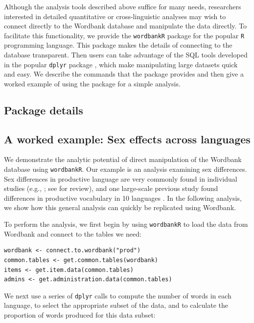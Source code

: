 \documentclass[doc,noapacite]{apa2}
\begin{document}
Although the analysis tools described above suffice for many needs, researchers interested in detailed quantitative or cross-linguistic analyses may wish to connect directly to the Wordbank database and manipulate the data directly. To facilitate this functionality, we provide the \texttt{wordbankR} package for the popular \texttt{R} programming language. This package makes the details of connecting to the database transparent. Then users can take advantage of the SQL tools developed in the popular \texttt{dplyr} package \cite{wickham2014}, which make manipulating large datasets quick and easy. We describe the commands that the package provides and then give a worked example of using the package for a simple analysis.

\subsection{Package details}



\subsection{A worked example: Sex effects across languages}

We demonstrate the analytic potential of direct manipulation of the Wordbank database using \texttt{wordbankR}. Our example is an analysis examining sex differences. Sex differences in productive language are very commonly found in individual studies (e.g., ; see  for review), and one large-scale previous study found differences in productive vocabulary in 10 languages \cite{eriksson2012}. In the following analysis, we show how this general analysis can quickly be replicated using Wordbank.

To perform the analysis, we first begin by using \texttt{wordbankR} to load the data from Wordbank and connect to the tables we need:

\begin{lstlisting}
wordbank <- connect.to.wordbank("prod")
common.tables <- get.common.tables(wordbank)
items <- get.item.data(common.tables)
admins <- get.administration.data(common.tables)
\end{lstlisting}

\noindent We next use a series of \texttt{dplyr} calls to compute the number of words in each language, to select the appropriate subset of the data, and to calculate the proportion of words produced for this data subset:
\end{document}
